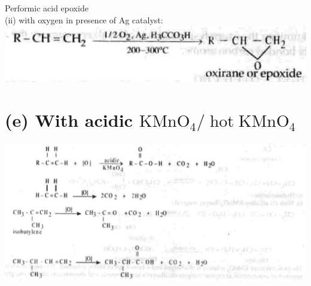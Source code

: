 \documentclass[10pt]{article}
\begin{document}
Performic acid epoxide\\
(ii) with oxygen in presence of Ag catalyst:\\
\includegraphics[max width=\textwidth, center]{2025_01_28_8470952b98110cec3aabg-184(1)}

\section*{(e) With acidic $\mathrm{KMnO}_{4} / \operatorname{hot} \mathrm{KMnO}_{4}$}
\begin{center}
\includegraphics[max width=\textwidth]{2025_01_28_8470952b98110cec3aabg-184(5)}
\end{center}
\end{document}
